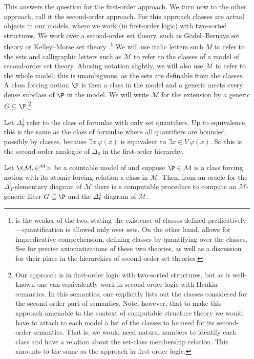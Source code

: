 \documentclass{amsart}
\begin{document}
 This answers the question for the first-order approach. We turn now to the other approach, call it the second-order approach. For this approach classes are actual objects in our models, where we work (in first-order logic) with two-sorted structures. We work over a second-order set theory, such as G\"odel--Bernays set theory \GB{} or Kelley--Morse set theory \KM.\footnote{\GB{} is the weaker of the two, stating the existence of classes defined predicatively---quantification is allowed only over sets. On the other hand, \KM{} allows for impredicative comprehension, defining classes by quantifying over the classes. See \cite{williams-min-km} for precise axiomatizations of these two theories, as well as a discussion for their place in the hierarchies of second-order set theories.}
 We will use italic letters such $M$ to refer to the sets and calligraphic letters such as $\mathcal M$ to refer to the classes of a model of second-order set theory. Abusing notation slightly, we will also use $\mathcal M$ to refer to the whole model; this is unambiguous, as the sets are definable from the classes. A class forcing notion $\P$ is then a class in the model and a generic meets every dense subclass of $\P$ in the model. We will write $\mathcal M$ for the extension by a generic $G \subseteq \P$.\footnote{Our approach is in first-order logic with two-sorted structures, but as is well-known one can equivalently work in second-order logic with Henkin semantics. In this semantics, one explicitly lists out the classes considered for the second-order part of semantics. Note, however, that to make this approach amenable to the context of computable structure theory we would have to attach to each model a list of the classes to be used for its second-order semantics. That is, we would need natural numbers to identify each class and have a relation about the set-class membership relation. This amounts to the same as the approach in first-order logic.}
 
 Let $\Delta^1_0$ refer to the class of formulae with only set quantifiers. Up to equivalence, this is the same as the class of formulae where all quantifiers are bounded, possibly by classes, because $\exists x\ \varphi(x)$ is equivalent to $\exists x \in V\ \varphi(x)$. So this is the second-order analogue of $\Delta_0$ in the first-order \Levy{} hierarchy.
 
 \begin{theorem}\label{Theorem.Computing-first-order-diagram-for-class-forcing}
 Let $\<\mathcal{M},\in^{\mathcal{M}}>$ be a countable model of \GB{} and suppose $\P \in \mathcal M$ is a class forcing notion with its atomic forcing relation a class in $\mathcal M$. Then, from an oracle for the $\Delta^1_0$-elementary diagram of $\mathcal{M}$ there is a computable procedure to compute an $\mathcal{M}$-generic filter $G \subseteq \P$ and the $\Delta^1_0$-diagram of $\mathcal{M}$.
 \end{theorem}
 
\end{document}
